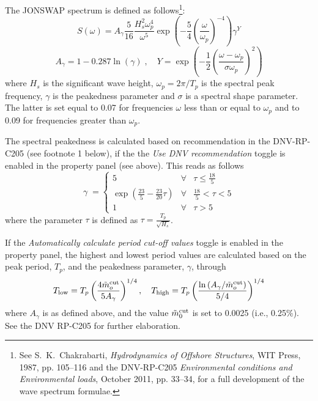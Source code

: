 The JONSWAP spectrum is defined as follows\footnote{
See S.~K.~Chakrabarti, {\sl Hydrodynamics of Offshore Structures}, WIT Press,
1987, pp. 105--116 and the DNV-RP-C205 {\sl Environmental conditions and
Environmental loads}, October 2011, pp. 33--34, for a full development
of the wave spectrum formulae.}:
%
\begin{equation}
S(\omega) = A_\gamma\frac{5}{16}\frac{H_s^2\omega_p^4}{\omega^5}
           \exp\left(-\frac{5}{4}\left(\frac{\omega}{\omega_p}\right)^{-4}\right)
           \gamma^Y
\end{equation}
\begin{equation*}
A_\gamma = 1 - 0.287\ln(\gamma)\;,\quad
Y = \exp\left(-\frac{1}{2}\left(\frac{\omega-\omega_p}{\sigma\omega_p}\right)^2
        \right)
\end{equation*}
%
where $H_s$ is the significant wave height,
$\omega_p=2\pi/T_p$ is the spectral peak frequency,
$\gamma$ is the peakedness parameter and $\sigma$ is a spectral shape parameter.
The latter is set equal to 0.07 for frequencies $\omega$ less than or equal to
$\omega_p$ and to 0.09 for frequencies greater than $\omega_p$.

The spectral peakedness is calculated based on recommendation in the DNV-RP-C205
(see footnote 1 below), if the the {\sl Use DNV recommendation} toggle
is enabled in the property panel (see above). This reads as follows
%
\begin{equation}
\gamma \;=\left\{\begin{array}{lll}
5 &\forall& \tau \le \frac{18}{5} \\
\exp\left(\frac{23}{5}-\frac{23}{20}\tau\right) &\forall& \frac{18}{5}<\tau<5 \\
1 &\forall& \tau > 5
\end{array}\right.
\end{equation}
%
where the parameter $\tau$ is defined as $\tau=\frac{T_p}{\sqrt{H_s}}$.


If the {\sl Automatically calculate period cut-off values} toggle is enabled
in the property panel, the highest and lowest period values are calculated
based on the peak period, $T_p$, and the peakedness parameter, $\gamma$, through
%
\begin{equation}
T_{\rm low} = T_p\left(\frac{4\tilde{m}_o^{\rm cut}}{5A_\gamma}\right)^{1/4},\quad
T_{\rm high} = T_p\left(\frac{\ln\left(A_\gamma/\tilde{m}_o^{\rm cut}\right)}{5/4}
                \right)^{1/4}
\end{equation}
%
where $A_\gamma$ is as defined above,
and the value $\tilde{m}_0^{\rm cut}$ is set to 0.0025 (i.e., 0.25\%).
See the DNV RP-C205 for further elaboration.

